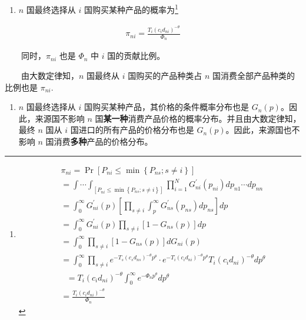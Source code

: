 \documentclass[
]{article}
\providecommand{\tightlist}{%
  \setlength{\itemsep}{0pt}\setlength{\parskip}{0pt}}
\begin{document}
\begin{enumerate}
\def\labelenumi{\arabic{enumi}.}
\tightlist
\item
  \(n\) 国最终选择从 \(i\) 国购买某种产品的概率为\footnote{\[
    \begin{aligned}
    &\pi_{n i}=\operatorname{Pr}\left[P_{n i} \leq \min \left\{P_{n s}; s \neq i\right\}\right] \\ 
    &=\int\cdots\int_{\left[P_{n i} \leq \min \left\{P_{n s}; s \neq i\right\}\right]}{ \prod_{i=1}^{N} G_{n i}^{\prime} \left(p_{n i}\right) d p_{n 1} \cdots d p_{n n}} \\
    &={\int_{0}^{\infty} G_{n i}^{\prime}(p)\left[\prod_{s \neq i} \int_{p}^{\infty}G_{n s}^{\prime}\left(p_{n s}\right) d p_{n s}\right] d p}\\
    &={\int_{0}^{\infty} G_{n i}^{\prime}(p)\prod_{s \neq i} \left [1 - G_{n s}(p)\right] dp} \\
    &=\int_{0}^{\infty} \prod_{s \neq i}\left[1-G_{n s}(p)\right] d G_{ni}(p) \\ 
    &=\int_{0}^{\infty} \prod_{s \neq i}e^{ -T_{s}\left(c_{s} d_{n s}\right)^{-\theta} p^{\theta}} \cdot e^{ -T_{i}\left(c_{i} d_{n i}\right)^{-\theta} p^{\theta}} T_{i}\left(c_{i} d_{n i}\right)^{-\theta} d p^{\theta}\\
    & \text {      }=T_{i}\left(c_{i} d_{n i}\right)^{-\theta}\int_{0}^{\infty} e^{ -\Phi_n p^{\theta}}  d p^{\theta}\\
    &=\frac{T_{i}\left(c_{i} d_{n i}\right)^{-\theta}}{\Phi_{n}} 
    \end{aligned} 
    \]}
\end{enumerate}

\begin{align}
\pi_{n i}=\frac{T_{i}\left(c_{i} d_{n i}\right)^{-\theta}}{\Phi_{n}}  \label{eq:8}
\end{align}

　　同时，\(\pi_{ni}\) 也是 \(\Phi_{n}\) 中 \(i\) 国的贡献比例。

　　由大数定律知，\(n\) 国最终从 \(i\) 国购买的产品种类占 \(n\) 国消费全部产品种类的比例也是 \(\pi_{ni}\).

\begin{enumerate}
\def\labelenumi{\arabic{enumi}.}
\setcounter{enumi}{1}
\tightlist
\item
  \(n\) 国最终选择从 \(i\) 国购买某种产品，其价格的条件概率分布也是 \(G_{n}(p)\)。因此，来源国不影响 \(n\) 国\textbf{某一种}消费产品价格的概率分布。并且由大数定律知，最终 \(n\) 国从 \(i\) 国进口的所有产品的价格分布也是 \(G_{n}(p)\)。因此，来源国也不影响 \(n\) 国消费\textbf{多种}产品的价格分布。
\end{enumerate}
\end{document}
